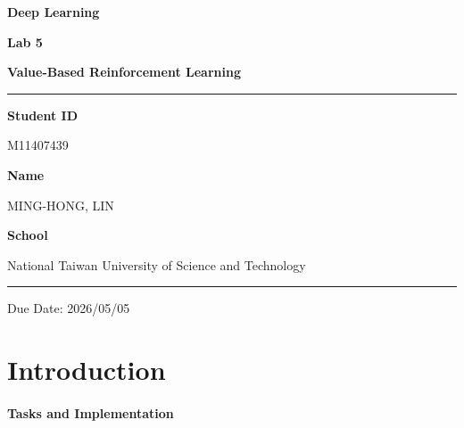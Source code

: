 \documentclass[12pt,a4paper]{report}
\begin{document}
\pagestyle{plain}

\begin{titlepage}
\centering
\vspace*{3cm}

{\fontsize{28}{34}\selectfont\bfseries Deep Learning\par}
\vspace{0.6em}
{\fontsize{20}{26}\selectfont\bfseries Lab 5 \par}
\vspace{0.4em}
{\fontsize{16}{22}\selectfont\bfseries Value-Based Reinforcement Learning \par}

\vspace{1.5cm}
\textcolor{crimson}{\rule{0.6\linewidth}{1.2pt}}
\vspace{1.5cm}

{\large\bfseries Student ID}\par
\vspace{0.4em}
{\large M11407439}\par

\vspace{0.8em}

{\large\bfseries Name}\par
\vspace{0.4em}
{\large MING-HONG, LIN}\par

\vspace{0.8cm}

{\large\bfseries School}\par
\vspace{0.4em}
{\large National Taiwan University of Science and Technology }\par

\vfill

\textcolor{crimson}{\rule{0.6\linewidth}{0.6pt}}\par
\vspace{0.5em}
{\small Due Date: 2026/05/05}

\end{titlepage}

\tableofcontents
\newpage

\chapter{Introduction}

\subsubsection*{Tasks and Implementation}
\end{document}
